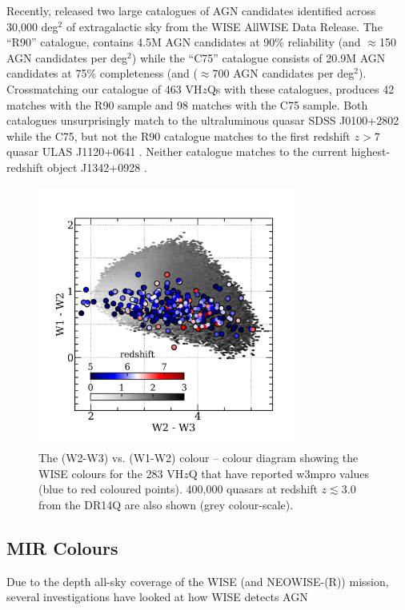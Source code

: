 \documentclass[usenatbib]{mnras}
\begin{document}
Recently, \citet{Assef2018} released two large catalogues of AGN
candidates identified across 30,000 deg$^2$ of extragalactic sky from
the WISE AllWISE Data Release. The ``R90'' catalogue, contains 4.5M
AGN candidates at 90\% reliability (and $\approx$150 AGN candidates
per deg$^2$) while the ``C75'' catalogue consists of 20.9M AGN
candidates at 75\% completeness (and ($\approx$700 AGN candidates per
deg$^2$). Crossmatching our catalogue of 463 VH$z$Qs with these
catalogues, produces 42 matches with the R90 sample and 98 matches
with the C75 sample. Both catalogues unsurprisingly match to the
ultraluminous quasar SDSS J0100+2802 \citep{Wu2015} while the C75, but
not the R90 catalogue matches to the first redshift $z>7$ quasar ULAS
J1120+0641 \citep{Mortlock2011}. Neither catalogue matches to the
current highest-redshift object J1342+0928 \citep{Banados2018}.


\begin{figure}
    \centering
    \includegraphics[width=8.6cm,  clip, trim=6mm 4mm 6mm 10mm]
    {../color_color/W1W2_plots/W1W2W3/W1W2W3_hexplots_20190610v2.png} 
  \vspace{-14pt}
    \caption{The (W2-W3) vs. (W1-W2) colour – colour diagram showing the WISE colours 
      for the 283 VH$z$Q that have reported w3mpro values (blue to red coloured points).
      400,000 quasars at redshift $z\lesssim3.0$ from the DR14Q are also shown
      (grey colour-scale). }
    \label{fig:W1W2W3}
\end{figure}
\subsection{MIR Colours}
Due to the depth all-sky coverage of the WISE (and NEOWISE-(R)) mission, 
several investigations have looked at how WISE detects AGN 
\citet[e.g][]{Stern2012, Assef2012, Secrest2015, LaMassa2017, Assef2018, Glikman2018, LaMassa2019} 
\end{document}
